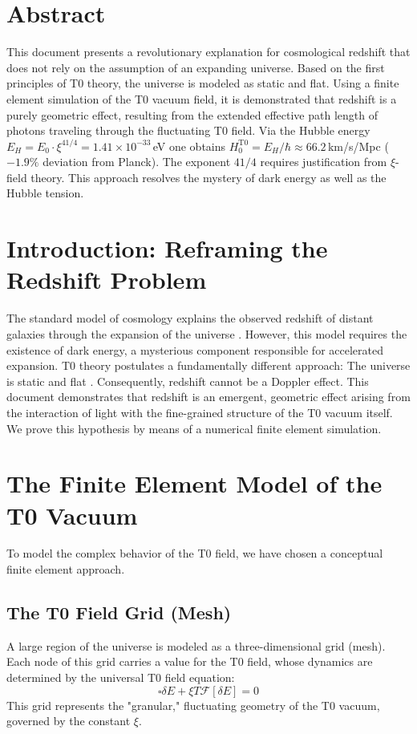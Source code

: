 \section*{Abstract}
		This document presents a revolutionary explanation for cosmological redshift that does not rely on the assumption of an expanding universe. Based on the first principles of T0 theory, the universe is modeled as static and flat. Using a finite element simulation of the T0 vacuum field, it is demonstrated that redshift is a purely geometric effect, resulting from the extended effective path length of photons traveling through the fluctuating T0 field. Via the Hubble energy $E_H = E_0 \cdot \xi^{41/4} = 1.41 \times 10^{-33}\,$eV one obtains $H_0^{\text{T0}} = E_H/\hbar \approx 66.2\,$km/s/Mpc ($-1.9\%$ deviation from Planck). The exponent $41/4$ requires justification from $\xi$-field theory. This approach resolves the mystery of dark energy as well as the Hubble tension.


	\section{Introduction: Reframing the Redshift Problem}
	The standard model of cosmology explains the observed redshift of distant galaxies through the expansion of the universe \cite{planck2018}. However, this model requires the existence of dark energy, a mysterious component responsible for accelerated expansion. T0 theory postulates a fundamentally different approach: The universe is static and flat \cite{pascher:t0_foundations}. Consequently, redshift cannot be a Doppler effect.
	This document demonstrates that redshift is an emergent, geometric effect arising from the interaction of light with the fine-grained structure of the T0 vacuum itself. We prove this hypothesis by means of a numerical finite element simulation.
	\section{The Finite Element Model of the T0 Vacuum}
	To model the complex behavior of the T0 field, we have chosen a conceptual finite element approach.
	\subsection{The T0 Field Grid (Mesh)}
	A large region of the universe is modeled as a three-dimensional grid (mesh). Each node of this grid carries a value for the T0 field, whose dynamics are determined by the universal T0 field equation:
	\begin{equation}
		\square\delta E + \xi T \mathcal{F}[\delta E] = 0
	\end{equation}
	This grid represents the "granular," fluctuating geometry of the T0 vacuum, governed by the constant $\xi$.
